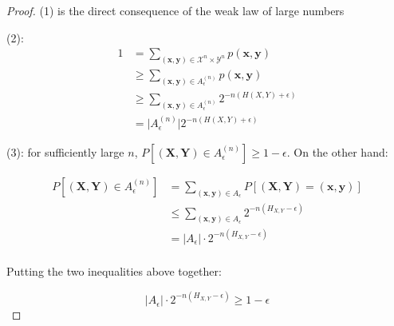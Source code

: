 \documentclass{article}
\newcommand{\norm}[1]{\vert {#1} \vert}
\begin{document}
    \begin{proof}
        (1) is the direct consequence of the weak law of large numbers

        (2):
        \begin{equation*}
            \begin{aligned}
                1 &= \sum_{
                    (\mathbf{x}, \mathbf{y}) \in \mathcal{X}^n \times \mathcal{Y}^n
                    } p(\mathbf{x}, \mathbf{y}) \\
                &\geq \sum_{
                    (\mathbf{x}, \mathbf{y}) \in A_\epsilon^{(n)}
                    } p(\mathbf{x}, \mathbf{y}) \\
                &\geq \sum_{
                    (\mathbf{x}, \mathbf{y}) \in A_\epsilon^{(n)}
                    } 2^{-n(H(X, Y) + \epsilon)} \\
                &=  \norm{A_\epsilon^{(n)}} 2^{-n(H(X, Y) + \epsilon)}
            \end{aligned}
        \end{equation*}

        (3): for sufficiently large $n$, $P[(\mathbf{X}, \mathbf{Y}) \in A_\epsilon^{(n)}] \geq 1 - \epsilon$. On the other hand:

        \begin{equation*}
            \begin{aligned}
                P[(\mathbf{X}, \mathbf{Y}) \in A_\epsilon^{(n)}]
                &= \sum_{(\mathbf{x}, \mathbf{y}) \in A_\epsilon}
                    P[(\mathbf{X}, \mathbf{Y}) = (\mathbf{x}, \mathbf{y})] \\
                &\leq \sum_{(\mathbf{x}, \mathbf{y}) \in A_\epsilon}
                    2^{-n(H_{X,Y} - \epsilon)} \\
                &= \norm{A_\epsilon} \cdot
                    2^{-n(H_{X,Y} - \epsilon)} \\
            \end{aligned}
        \end{equation*}

        Putting the two inequalities above together:

        \begin{equation*}
            \norm{A_\epsilon} \cdot 2^{-n(H_{X,Y} - \epsilon)} \geq 1 - \epsilon
        \end{equation*}
        

\end{proof}
\end{document}
